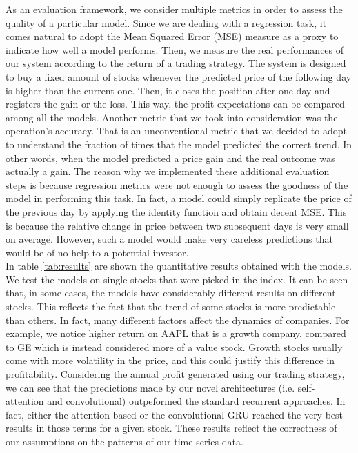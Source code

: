 \documentclass{article}
\begin{document}
As an evaluation framework, we consider multiple metrics in order to assess the quality
of a particular model. Since we are dealing with a regression task, it comes natural
to adopt the Mean Squared Error (MSE) measure as a proxy to indicate how well a model
performs. Then, we measure the real performances
of our system according to the return of a trading strategy. The system is
designed to buy a fixed amount of stocks whenever the predicted price of
the following day is higher than the current one. Then, it closes the position after one
day and registers the gain or the loss. This way, the profit expectations can be compared
among all the models. Another metric that we took into consideration was the operation's
accuracy. That is an unconventional metric that we decided to adopt to understand the
fraction of times that the model predicted the correct trend. In other words, when the model
predicted a price gain and the real outcome was actually a gain. The reason why we
implemented these additional evaluation steps is because regression metrics were not enough
to assess the goodness of the model in performing this task. In fact, a model could
simply replicate the price of the previous day by applying the identity function and obtain
decent MSE. This is because the relative change in price between two subsequent days is
very small on average. However, such a model would make very careless predictions that
would be of no help to a potential investor. \\
In table \ref{tab:results} are shown the quantitative results obtained with the models.
We test the models on single stocks that were picked in the index. It can be seen that, in some cases,
the models have considerably different results on different stocks. This reflects the fact that the trend
of some stocks is more predictable than others. In fact, many different factors affect the dynamics of companies.
For example, we notice higher return on AAPL that is a growth company, compared to GE which is instead
considered more of a value stock. Growth stocks usually come with more volatility in the price, and this could
justify this difference in profitability.
Considering the annual profit generated using our trading strategy,
we can see that the predictions made by our novel architectures (i.e. self-attention
and convolutional) outpeformed the standard recurrent approaches. In fact, either the attention-based
or the convolutional GRU reached the very best results in those terms for a given stock.
These results reflect the correctness of our assumptions on the patterns of our time-series data.
\end{document}
